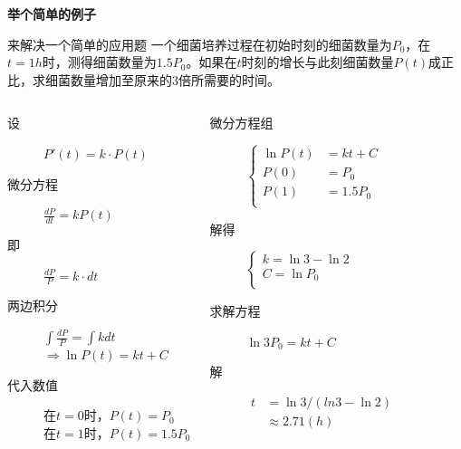 \documentclass[presentation]{beamer}
\begin{document}
\begin{CJK*}{UTF8}{gbsn}
\begin{frame}{\textbf{举个简单的例子}}
\begin{exampleblock}{来解决一个简单的应用题}
一个细菌培养过程在初始时刻的细菌数量为$P_0$，在$t=1h$时，测得细菌数量为$1.5P_0$。如果在$t$时刻的增长与此刻细菌数量$P(t)$成正比，求细菌数量增加至原来的3倍所需要的时间。
\end{exampleblock}

\begin{columns}
\begin{description}
 \item[设] $P'(t) = k \cdot P(t)$ 
 \item[微分方程] $\frac{{dP}}{{dt}} = kP(t)$
 \item[即]  $\frac{{dP}}{{P}} = k \cdot dt$
 \item[两边积分] $\int {\frac{{dP}}{P} = \int {kdt} } $\\
 $ \Rightarrow \ln P(t) = kt + C$
 \item[代入数值] 在$t=0$时，$P(t)=P_0$\\
 在$t=1$时，$P(t)=1.5P_0$
\end{description}
\begin{description}
	 \item[微分方程组] $
	 \left\{
	 \begin{aligned}
	 \ln P(t) &= kt + C \\
	 P(0)&=P_0 \\
	 P(1)&=1.5P_0 \\
	 \end{aligned}
	 \right.
	 $
	 \item[解得] $
	 \left\{
	 \begin{aligned}
	 k=\ln 3-\ln 2 \\
	 C=\ln P_0 \\
	 \end{aligned}
	 \right.
	 $
	 \item[求解方程] $\ln 3P_0 = kt + C$
	 \item[解] $ 
	 \begin{aligned}
	 t&=\ln 3/(ln3 - \ln 2) \\
	  & \approx 2.71 (h)
	 \end{aligned}$
\end{description}
\end{columns}
\end{frame}


\end{CJK*}
\end{document}
